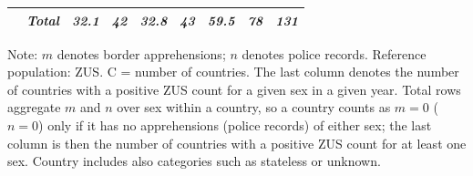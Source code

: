 \begin{table}[ht!]
\begin{tabular*}{\linewidth}{@{\extracolsep{\fill}}llrrrrrrr}
{\itshape } & {\itshape Total} & {\itshape 32.1} & {\itshape 42} & {\itshape 32.8} & {\itshape 43} & {\itshape 59.5} & {\itshape 78} & {\itshape 131} \\ 
\bottomrule
\end{tabular*}
\begin{minipage}{\linewidth}
\vspace{.05em}
Note: $m$ denotes border apprehensions; $n$ denotes police records. Reference population: ZUS. C = number of countries. The last column denotes the number of countries with a positive ZUS count for a given sex in a given year. Total rows aggregate $m$ and $n$ over sex within a country, so a country counts as $m=0$ ($n=0$) only if it has no apprehensions (police records) of either sex; the last column is then the number of countries with a positive ZUS count for at least one sex. Country includes also categories such as stateless or unknown.\\
\end{minipage}
\end{table}

